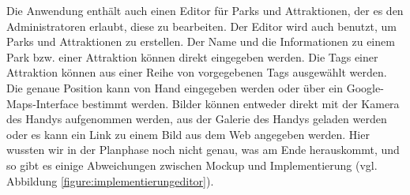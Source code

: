 Die Anwendung enthält auch einen Editor für Parks und Attraktionen, der es den Administratoren erlaubt, diese zu bearbeiten. Der Editor wird auch benutzt, um Parks und Attraktionen zu erstellen. Der Name und die Informationen zu einem Park bzw. einer Attraktion können direkt eingegeben werden. Die Tags einer Attraktion können aus einer Reihe von vorgegebenen Tags ausgewählt werden. Die genaue Position kann von Hand eingegeben werden oder über ein Google-Maps-Interface bestimmt werden. Bilder können entweder direkt mit der Kamera des Handys aufgenommen werden, aus der Galerie des Handys geladen werden oder es kann ein Link zu einem Bild aus dem Web angegeben werden. Hier wussten wir in der Planphase noch nicht genau, was am Ende herauskommt, und so gibt es einige Abweichungen zwischen Mockup und Implementierung (vgl. Abbildung \ref{figure:implementierungeditor}).


